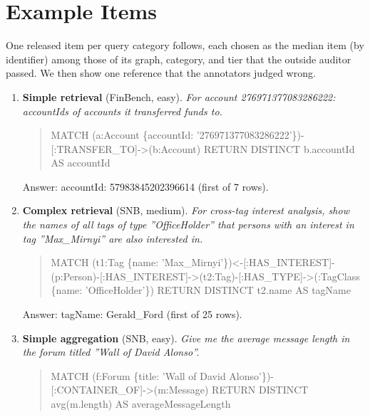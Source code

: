 \section{Example Items}
\label{app:examples}
One released item per query category follows, each chosen as the median item (by identifier) among those of its graph, category, and tier that the outside auditor passed. We then show one reference that the annotators judged wrong.
\begin{enumerate}\setlength\itemsep{2pt}
\item \textbf{Simple retrieval} (FinBench, easy). \emph{For account 276971377083286222: accountIds of accounts it transferred funds to.}
\begin{quote}\scriptsize\ttfamily\raggedright\sloppy MATCH (a\allowbreak{}:Account \{accountId\allowbreak{}: '276971377083286222'\})\allowbreak{}\allowbreak{}-[\allowbreak{}:TRANSFER\_TO]\allowbreak{}-\textgreater{}(\allowbreak{}b\allowbreak{}:Account) RETURN DISTINCT b.accountId AS accountId\end{quote}
\noindent Answer: accountId: 57983845202396614 (first of 7 rows).
\item \textbf{Complex retrieval} (SNB, medium). \emph{For cross-tag interest analysis, show the names of all tags of type ''OfficeHolder'' that persons with an interest in tag ''Max\_Mirnyi'' are also interested in.}
\begin{quote}\scriptsize\ttfamily\raggedright\sloppy MATCH (t1\allowbreak{}:Tag \{name\allowbreak{}: 'Max\_Mirnyi'\})\allowbreak{}\textless{}-\allowbreak{}[\allowbreak{}:HAS\_INTEREST]\allowbreak{}-(p\allowbreak{}:Person)\allowbreak{}-[\allowbreak{}:HAS\_INTEREST]\allowbreak{}-\textgreater{}(\allowbreak{}t2\allowbreak{}:Tag)\allowbreak{}-[\allowbreak{}:HAS\_TYPE]\allowbreak{}-\textgreater{}(\allowbreak{}\allowbreak{}:TagClass \{name\allowbreak{}: 'OfficeHolder'\})\allowbreak{} RETURN DISTINCT t2.name AS tagName\end{quote}
\noindent Answer: tagName: Gerald\_Ford (first of 25 rows).
\item \textbf{Simple aggregation} (SNB, easy). \emph{Give me the average message length in the forum titled ''Wall of David Alonso''.}
\begin{quote}\scriptsize\ttfamily\raggedright\sloppy MATCH (f\allowbreak{}:Forum \{title\allowbreak{}: 'Wall of David Alonso'\})\allowbreak{}\allowbreak{}-[\allowbreak{}:CONTAINER\_OF]\allowbreak{}-\textgreater{}(\allowbreak{}m\allowbreak{}:Message) RETURN DISTINCT avg(m.length) AS averageMessageLength\end{quote}

\end{enumerate}
